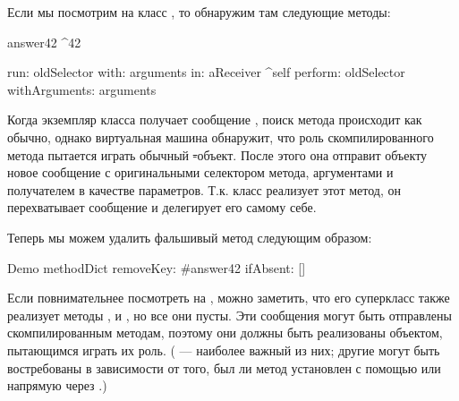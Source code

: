 \documentclass[a4paper,10pt,twoside]{book}
\begin{document}
Если мы посмотрим на класс , то обнаружим там следующие методы:
\begin{code}{}
answer42
	^42

run: oldSelector with: arguments in: aReceiver
	^self perform: oldSelector withArguments: arguments
\end{code}

Когда экземпляр класса  получает сообщение , поиск метода происходит как обычно, однако виртуальная машина обнаружит, что роль скомпилированного метода пытается играть обычный \st-объект.
После этого она отправит объекту новое сообщение  с оригинальными селектором метода, аргументами и получателем в качестве параметров.
Т.к. класс  реализует этот метод, он перехватывает сообщение и делегирует его самому себе.

Теперь мы можем удалить фальшивый метод следующим образом:
\begin{code}{}
Demo methodDict removeKey: #answer42 ifAbsent: []
\end{code}

Если повнимательнее посмотреть на , можно заметить, что его суперкласс также реализует методы ,  и , но все они пусты. Эти сообщения могут быть отправлены скомпилированным методам, поэтому они должны быть реализованы объектом, пытающимся играть их роль. ( --- наиболее важный из них; другие могут быть востребованы в зависимости от того, был ли метод установлен с помощью  или напрямую через .)
\end{document}
